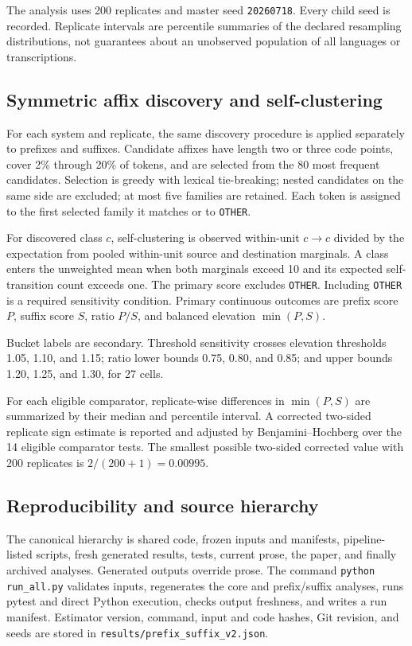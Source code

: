 \documentclass[11pt]{article}
\begin{document}
The analysis uses 200 replicates and master seed \texttt{20260718}. Every
child seed is recorded. Replicate intervals are percentile summaries of the
declared resampling distributions, not guarantees about an unobserved
population of all languages or transcriptions.

\subsection{Symmetric affix discovery and self-clustering}

For each system and replicate, the same discovery procedure is applied
separately to prefixes and suffixes. Candidate affixes have length two or
three code points, cover 2\% through 20\% of tokens, and are selected from the
80 most frequent candidates. Selection is greedy with lexical tie-breaking;
nested candidates on the same side are excluded; at most five families are
retained. Each token is assigned to the first selected family it matches or to
\texttt{OTHER}.

For discovered class $c$, self-clustering is observed within-unit
$c\to c$ divided by the expectation from pooled within-unit source and
destination marginals. A class enters the unweighted mean when both marginals
exceed 10 and its expected self-transition count exceeds one. The primary
score excludes \texttt{OTHER}. Including \texttt{OTHER} is a required
sensitivity condition. Primary continuous outcomes are prefix score $P$,
suffix score $S$, ratio $P/S$, and balanced elevation $\min(P,S)$.

Bucket labels are secondary. Threshold sensitivity crosses elevation
thresholds 1.05, 1.10, and 1.15; ratio lower bounds 0.75, 0.80, and 0.85; and
upper bounds 1.20, 1.25, and 1.30, for 27 cells.

For each eligible comparator, replicate-wise differences in $\min(P,S)$ are
summarized by their median and percentile interval. A corrected two-sided
replicate sign estimate is reported and adjusted by Benjamini--Hochberg over
the 14 eligible comparator tests. The smallest possible two-sided corrected
value with 200 replicates is $2/(200+1)=0.00995$.

\subsection{Reproducibility and source hierarchy}

The canonical hierarchy is shared code, frozen inputs and manifests,
pipeline-listed scripts, fresh generated results, tests, current prose, the
paper, and finally archived analyses. Generated outputs override prose. The
command \texttt{python run\_all.py} validates inputs, regenerates the core and
prefix/suffix analyses, runs pytest and direct Python execution, checks output
freshness, and writes a run manifest. Estimator version, command, input and
code hashes, Git revision, and seeds are stored in
\texttt{results/prefix\_suffix\_v2.json}.
\end{document}

